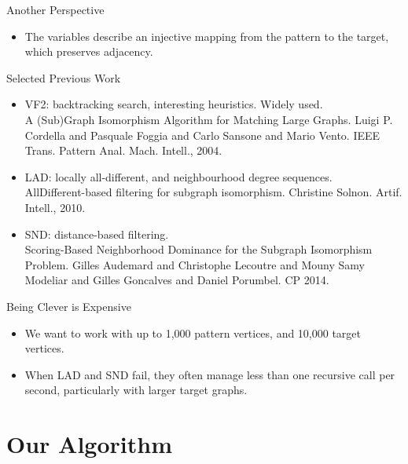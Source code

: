 \documentclass{beamer}
\begin{document}
\begin{frame}{Another Perspective}
    \begin{itemize}
        \item The variables describe an injective mapping from the pattern to the target, which
            preserves adjacency.
    \end{itemize}
\end{frame}

\begin{frame}{Selected Previous Work}
    \begin{itemize}
        \item VF2: backtracking search, interesting heuristics. Widely used. \\[0.1cm]
            {\scriptsize A (Sub)Graph Isomorphism Algorithm for Matching Large Graphs. Luigi P.
            Cordella and Pasquale Foggia and Carlo Sansone and Mario Vento. {IEEE} Trans.
        Pattern Anal. Mach. Intell., 2004.}

        \item LAD: locally all-different, and neighbourhood degree sequences. \\[0.1cm]
            {\scriptsize AllDifferent-based filtering for subgraph isomorphism. Christine Solnon.
            Artif. Intell., 2010.}
        \item SND: distance-based filtering. \\[0.1cm]
            {\scriptsize Scoring-Based Neighborhood Dominance for the Subgraph Isomorphism Problem.
            Gilles Audemard and Christophe Lecoutre and Mouny Samy Modeliar and Gilles
        Goncalves and Daniel Porumbel. CP 2014.}
    \end{itemize}
\end{frame}

\begin{frame}{Being Clever is Expensive}
    \begin{itemize}
        \item We want to work with up to 1,000 pattern vertices, and 10,000 target vertices.

        \item When LAD and SND fail, they often manage less than one recursive call per second,
            particularly with larger target graphs.
    \end{itemize}
\end{frame}

\section{Our Algorithm}
\frame{\sectionpage}
\end{document}
